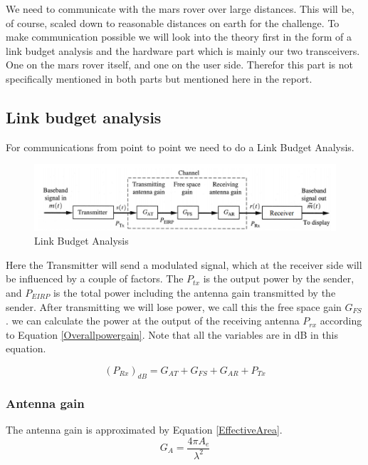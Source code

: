 \documentclass[10pt,a4paper]{article}
\begin{document}
We need to communicate with the mars rover over large distances. This will be, of course, scaled down to reasonable distances on earth for the challenge. To make communication possible we will look into the theory first in the form of a link budget analysis and the hardware part which is mainly our two transceivers. One on the mars rover itself, and one on the user side. Therefor this part is not specifically mentioned in both parts but mentioned here in the report.

\subsection{Link budget analysis}
For communications from point to point we need to do a Link Budget Analysis.

\begin{figure}[!h]
    \centering
    \includegraphics[scale=0.6]{figures/LinkBudget.png}
    \caption{Link Budget Analysis}
\end{figure}

Here the Transmitter will send a modulated signal, which at the receiver side will be influenced by a couple of factors. The $P_{tx}$ is the output power by the sender, and $P_{EIRP}$ is the total power including the antenna gain transmitted by the sender. After transmitting we will lose power, we call this the free space gain $G_{FS}$. we can calculate the power at the output of the receiving antenna $P_{rx}$ according to Equation \ref{Overallpowergain}. Note that all the variables are in dB in this equation.

\begin{equation}
\label{Overallpowergain}
(P_{Rx})_{dB} = G_{AT} + G_{FS} + G_{AR} + P_{Tx}
\end{equation}
\subsubsection{Antenna gain}
The antenna gain is approximated by Equation \ref{EffectiveArea}.
\begin{equation}
\label{EffectiveArea}
G_{A} = \frac{4 \pi A_e}{\lambda^2}
\end{equation}
\end{document}

